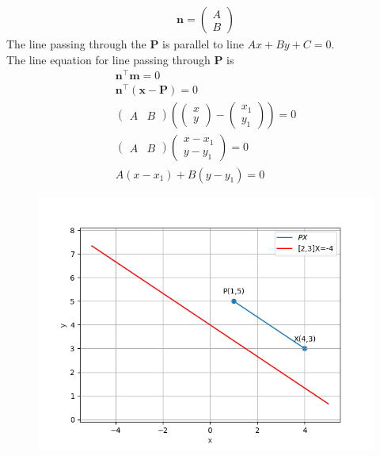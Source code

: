 \documentclass[10pt]{article}
\providecommand{\brak}[1]{\ensuremath{\left(#1\right)}}
\newcommand{\myvec}[1]{\ensuremath{\begin{pmatrix}#1\end{pmatrix}}}
\let\vec\mathbf{}
\begin{document}
\begin{enumerate}
\begin{align}
\vec{n}=\myvec{A\\B}
\end{align}
The line passing through the $\vec{P}$ is parallel to line $Ax+By+C=0$.\\
The line equation for line passing through $\vec{P}$ is
\begin{align}
\vec{n}^{\top}\vec{m}=0\\
\vec{n}^\top\brak{\vec{x}-\vec{P}}=0\\
\myvec{A&B}\brak{\myvec{x\\y}-\myvec{x_1\\y_1}}=0\\
\myvec{A&B}\myvec{x-x_1\\y-y_1}=0\\
A(x-x_1)+B(y-y_1)=0
\end{align}
\begin{figure}[!h]
	\begin{center}
		\includegraphics[width=\columnwidth]{./figs/fig.png}
	\end{center}
\caption{}
\label{fig:Fig1}
\end{figure}

\end{enumerate}
\end{document}
